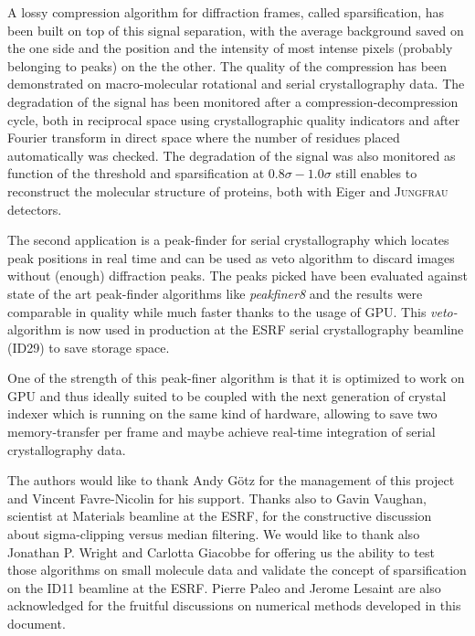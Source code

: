 \documentclass[preprint]{iucr}              %
\begin{document}
A lossy compression algorithm for diffraction frames, called sparsification, has been built on top of this signal separation, with the average background saved on the one side and the position and the intensity of most intense pixels (probably belonging to peaks) on the the other.
The quality of the compression has been demonstrated on macro-molecular rotational and serial crystallography data. 
The degradation of the signal has been monitored after a compression-decompression cycle, both in reciprocal space using crystallographic quality indicators and after Fourier transform in direct space where the number of residues placed automatically was checked.
The degradation of the signal was also monitored as function of the threshold and sparsification at $0.8\sigma-1.0\sigma$ still enables to reconstruct the molecular structure of proteins, both with Eiger and \textsc{Jungfrau} detectors.

The second application is a peak-finder for serial crystallography which locates peak positions in real time and can be used as veto algorithm to discard images without (enough) diffraction peaks. 
The peaks picked have been evaluated against state of the art peak-finder algorithms like \textit{peakfiner8} and the results were comparable in quality while much faster thanks to the usage of GPU.  
This \textit{veto-}algorithm is now used in production at the ESRF serial crystallography beamline (ID29) to save storage space.

One of the strength of this peak-finer algorithm is that it is optimized to work on GPU and thus ideally suited to be coupled with the next generation of crystal indexer \cite{toro} which is running on the same kind of hardware, allowing to save two memory-transfer per frame and maybe achieve real-time integration of serial crystallography data.



The authors would like to thank Andy G\"otz for the management of this project and Vincent Favre-Nicolin for his support.
Thanks also to Gavin Vaughan, scientist at Materials beamline at the ESRF,  for the constructive discussion about sigma-clipping versus median filtering.
We would like to thank also Jonathan P. Wright and Carlotta Giacobbe for offering us the ability to test those algorithms on small molecule data and validate the concept of sparsification on the ID11 beamline at the ESRF.
Pierre Paleo and Jerome Lesaint are also acknowledged for the fruitful discussions on numerical methods developed in this document.



\end{document}
